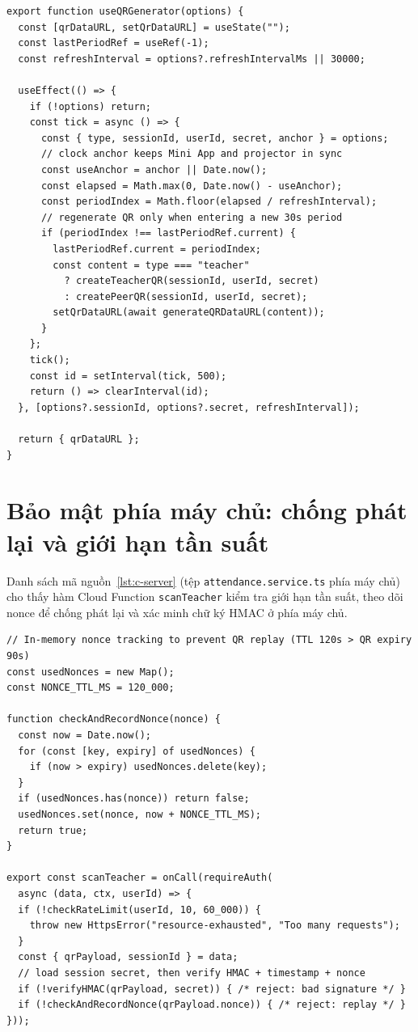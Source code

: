 \documentclass[../main.tex]{subfiles}
\begin{document}
\begin{lstlisting}[caption={useQRGenerator --- mã QR xoay 30 giây có đồng bộ},captionpos=b,label=lst:c-qrgen]
export function useQRGenerator(options) {
  const [qrDataURL, setQrDataURL] = useState("");
  const lastPeriodRef = useRef(-1);
  const refreshInterval = options?.refreshIntervalMs || 30000;

  useEffect(() => {
    if (!options) return;
    const tick = async () => {
      const { type, sessionId, userId, secret, anchor } = options;
      // clock anchor keeps Mini App and projector in sync
      const useAnchor = anchor || Date.now();
      const elapsed = Math.max(0, Date.now() - useAnchor);
      const periodIndex = Math.floor(elapsed / refreshInterval);
      // regenerate QR only when entering a new 30s period
      if (periodIndex !== lastPeriodRef.current) {
        lastPeriodRef.current = periodIndex;
        const content = type === "teacher"
          ? createTeacherQR(sessionId, userId, secret)
          : createPeerQR(sessionId, userId, secret);
        setQrDataURL(await generateQRDataURL(content));
      }
    };
    tick();
    const id = setInterval(tick, 500);
    return () => clearInterval(id);
  }, [options?.sessionId, options?.secret, refreshInterval]);

  return { qrDataURL };
}
\end{lstlisting}

\section{Bảo mật phía máy chủ: chống phát lại và giới hạn tần suất}

Danh sách mã nguồn~\ref{lst:c-server} (tệp \texttt{attendance.service.ts} phía máy chủ) cho thấy hàm
Cloud Function \texttt{scanTeacher} kiểm tra giới hạn tần suất, theo dõi nonce để chống phát
lại và xác minh chữ ký HMAC ở phía máy chủ.

\begin{lstlisting}[caption={Cloud Function --- chống phát lại và giới hạn tần suất},captionpos=b,label=lst:c-server]
// In-memory nonce tracking to prevent QR replay (TTL 120s > QR expiry 90s)
const usedNonces = new Map();
const NONCE_TTL_MS = 120_000;

function checkAndRecordNonce(nonce) {
  const now = Date.now();
  for (const [key, expiry] of usedNonces) {
    if (now > expiry) usedNonces.delete(key);
  }
  if (usedNonces.has(nonce)) return false;
  usedNonces.set(nonce, now + NONCE_TTL_MS);
  return true;
}

export const scanTeacher = onCall(requireAuth(
  async (data, ctx, userId) => {
  if (!checkRateLimit(userId, 10, 60_000)) {
    throw new HttpsError("resource-exhausted", "Too many requests");
  }
  const { qrPayload, sessionId } = data;
  // load session secret, then verify HMAC + timestamp + nonce
  if (!verifyHMAC(qrPayload, secret)) { /* reject: bad signature */ }
  if (!checkAndRecordNonce(qrPayload.nonce)) { /* reject: replay */ }
}));
\end{lstlisting}
\end{document}
